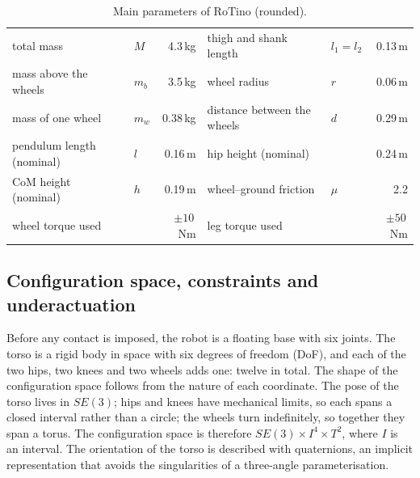 \documentclass[11pt,a4paper]{article}
\begin{document}
\begin{table}[t]
  \centering\small
  \caption{Main parameters of RoTino (rounded).}
  \label{tab:params}
  \begin{tabular}{@{}llr@{\hspace{10mm}}llr@{}}
    \toprule
    total mass & $M$ & 4.3\,kg & thigh and shank length & $l_1=l_2$ & 0.13\,m \\
    mass above the wheels & $m_b$ & 3.5\,kg & wheel radius & $r$ & 0.06\,m \\
    mass of one wheel & $m_w$ & 0.38\,kg & distance between the wheels & $d$ & 0.29\,m \\
    pendulum length (nominal) & $l$ & 0.16\,m & hip height (nominal) & & 0.24\,m \\
    CoM height (nominal) & $h$ & 0.19\,m & wheel--ground friction & $\mu$ & 2.2 \\
    wheel torque used & & $\pm 10$\,Nm & leg torque used & & $\pm 50$\,Nm \\
    \bottomrule
  \end{tabular}
\end{table}





\subsection{Configuration space, constraints and underactuation}

Before any contact is imposed, the robot is a floating base with six joints. The torso is a rigid body in space
with six degrees of freedom (DoF), and each of the two hips, two knees and two wheels adds one: twelve in total.
The shape of the configuration space follows from the nature of each coordinate. The pose of the torso lives in
$SE(3)$; hips and knees have mechanical limits, so each spans a closed interval rather than a circle; the wheels
turn indefinitely, so together they span a torus. The configuration space is therefore
$SE(3)\times I^4\times T^2$, where $I$ is an interval. The orientation of the torso is described with quaternions,
an implicit representation that avoids the singularities of a three-angle parameterisation.
\end{document}
